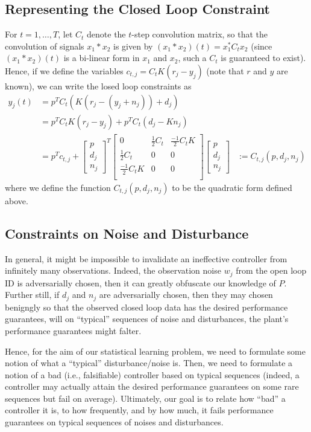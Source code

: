 \documentclass[11pt]{article} %
\theoremstyle{plain}
\theoremstyle{definition}
\theoremstyle{remark}
\begin{document}
\subsection{Representing the Closed Loop Constraint}
For $t = 1,\dots,T$, let $C_t$ denote the $t$-step convolution matrix, so that the convolution of signals $x_1 * x_2$ is given by $(x_1 * x_2)(t) = x_1^* C_tx_2$ (since $(x_1 * x_2)(t)$ is a bi-linear form in $x_1$ and $x_2$, such a $C_t$ is guaranteed to exist). Hence, if we define the variables $c_{t,j} = C_t K(r_j - y_j)$ (note that $r$ and $y$ are known), we can write the losed loop constraints as
\begin{align*}
   y_j(t) &= p^T C_t ( K(r_j-(y_j+n_j)) +d_j) \\
   &= p^T C_t K(r_j - y_j) + p^TC_t(d_j - Kn_j)\\
    &= p^T c_{t,j} + \begin{bmatrix} p \\
    d_j \\
    n_j \end{bmatrix}^T \begin{bmatrix} 0 & \frac{1}{2}C_t & \frac{-1}{2}C_t K  \\
    \frac{1}{2}C_t & 0 & 0 \\
     \frac{-1}{2}C_t K & 0 & 0 \\
     \end{bmatrix} \begin{bmatrix} p \\
    d_j \\
    n_j \end{bmatrix}
    &:= C_{t,j}(p,d_j,n_j)
\end{align*}
where we define the function $C_{t,j}(p,d_j,n_j)$ to be the quadratic form defined above.
\subsection{Constraints on Noise and Disturbance}
In general, it might be impossible to invalidate an ineffective controller from infinitely many observations. Indeed, the observation noise $w_j$ from the open loop ID is adversarially chosen, then it can greatly obfuscate our knowledge of $P$. Further still, if $d_j$ and $n_j$ are adversarially chosen, then they may chosen benigngly so that the observed closed loop data has the desired performance guarantees, will on ``typical'' sequences of noise and disturbances, the plant's performance guarantees might falter. 

Hence, for the aim of our statistical learning problem, we need to formulate some notion of what a ``typical'' disturbance/noise is. Then, we need to formulate a notion of a bad (i.e., falsifiable) controller based on typical sequences (indeed, a controller may actually attain the desired performance guarantees on some rare sequences but fail on average). Ultimately, our goal is to relate how ``bad'' a controller it is, to how frequently, and by how much, it fails performance guarantees on typical sequences of noises and disturbances. 
\end{document}
